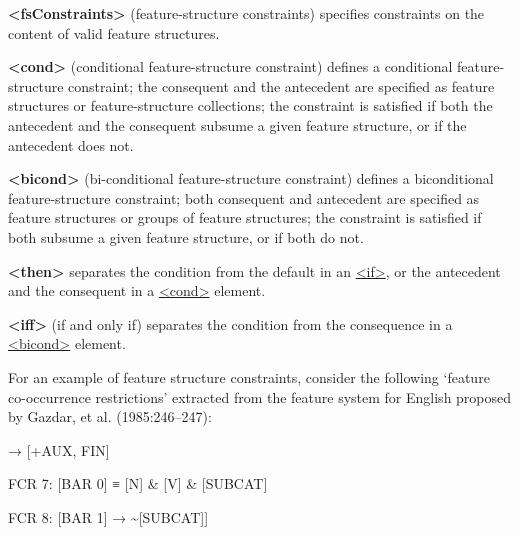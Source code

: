 \begin{sansreflist}
  
\item [\textbf{<fsConstraints>}] (feature-structure constraints) specifies constraints on the content of valid feature structures.
\item [\textbf{<cond>}] (conditional feature-structure constraint) defines a conditional feature-structure constraint; the consequent and the antecedent are specified as feature structures or feature-structure collections; the constraint is satisfied if both the antecedent and the consequent subsume a given feature structure, or if the antecedent does not.
\item [\textbf{<bicond>}] (bi-conditional feature-structure constraint) defines a biconditional feature-structure constraint; both consequent and antecedent are specified as feature structures or groups of feature structures; the constraint is satisfied if both subsume a given feature structure, or if both do not.
\item [\textbf{<then>}] separates the condition from the default in an \hyperref[TEI.if]{<if>}, or the antecedent and the consequent in a \hyperref[TEI.cond]{<cond>} element.
\item [\textbf{<iff>}] (if and only if) separates the condition from the consequence in a \hyperref[TEI.bicond]{<bicond>} element.
\end{sansreflist}
\par
For an example of feature structure constraints, consider the following ‘feature co-occurrence restrictions’ extracted from the feature system for English proposed by Gazdar, et al. (1985:246–247): \par\hfill\bgroup\exampleFont\vskip 10pt\begin{shaded}
\obeyspaces [FCR 1: [+INV] → [+AUX, FIN]\end{shaded}
\par\egroup 
 \par\hfill\bgroup\exampleFont\vskip 10pt\begin{shaded}
\obeyspaces FCR 7: [BAR 0] ≡ [N] \& [V] \& [SUBCAT]\end{shaded}
\par\egroup 
 \par\hfill\bgroup\exampleFont\vskip 10pt\begin{shaded}
\obeyspaces FCR 8: [BAR 1] → \textasciitilde [SUBCAT]]\end{shaded}
\par\egroup 
\par
